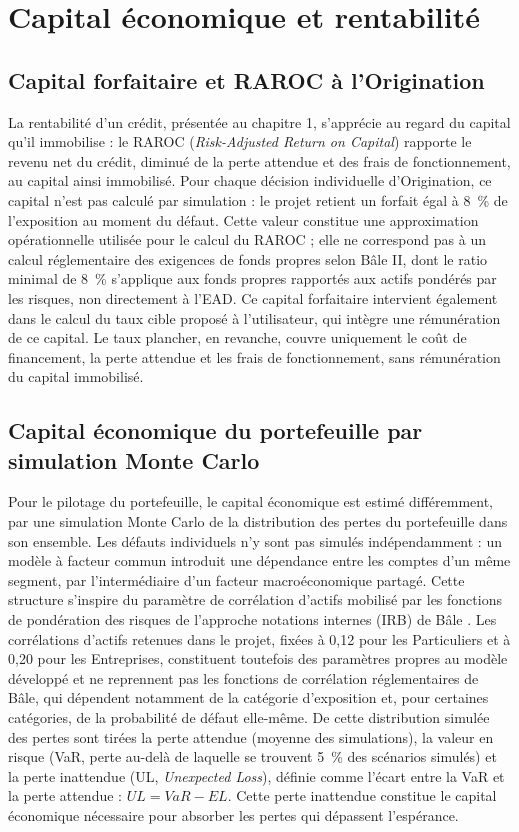 \section{Capital économique et rentabilité}

\subsection{Capital forfaitaire et RAROC à l'Origination}

La rentabilité d'un crédit, présentée au chapitre 1, s'apprécie au regard du capital qu'il immobilise : le RAROC (\emph{Risk-Adjusted Return on Capital}) rapporte le revenu net du crédit, diminué de la perte attendue et des frais de fonctionnement, au capital ainsi immobilisé. Pour chaque décision individuelle d'Origination, ce capital n'est pas calculé par simulation : le projet retient un forfait égal à 8~\% de l'exposition au moment du défaut. Cette valeur constitue une approximation opérationnelle utilisée pour le calcul du RAROC ; elle ne correspond pas à un calcul réglementaire des exigences de fonds propres selon Bâle II, dont le ratio minimal de 8~\% s'applique aux fonds propres rapportés aux actifs pondérés par les risques, non directement à l'EAD. Ce capital forfaitaire intervient également dans le calcul du taux cible proposé à l'utilisateur, qui intègre une rémunération de ce capital. Le taux plancher, en revanche, couvre uniquement le coût de financement, la perte attendue et les frais de fonctionnement, sans rémunération du capital immobilisé.

\subsection{Capital économique du portefeuille par simulation Monte Carlo}

Pour le pilotage du portefeuille, le capital économique est estimé différemment, par une simulation Monte Carlo de la distribution des pertes du portefeuille dans son ensemble. Les défauts individuels n'y sont pas simulés indépendamment : un modèle à facteur commun introduit une dépendance entre les comptes d'un même segment, par l'intermédiaire d'un facteur macroéconomique partagé. Cette structure s'inspire du paramètre de corrélation d'actifs mobilisé par les fonctions de pondération des risques de l'approche notations internes (IRB) de Bâle \parencite{BCBS_CRE31}. Les corrélations d'actifs retenues dans le projet, fixées à 0,12 pour les Particuliers et à 0,20 pour les Entreprises, constituent toutefois des paramètres propres au modèle développé et ne reprennent pas les fonctions de corrélation réglementaires de Bâle, qui dépendent notamment de la catégorie d'exposition et, pour certaines catégories, de la probabilité de défaut elle-même. De cette distribution simulée des pertes sont tirées la perte attendue (moyenne des simulations), la valeur en risque (VaR, perte au-delà de laquelle se trouvent 5~\% des scénarios simulés) et la perte inattendue (UL, \emph{Unexpected Loss}), définie comme l'écart entre la VaR et la perte attendue : $UL = VaR - EL$. Cette perte inattendue constitue le capital économique nécessaire pour absorber les pertes qui dépassent l'espérance.

